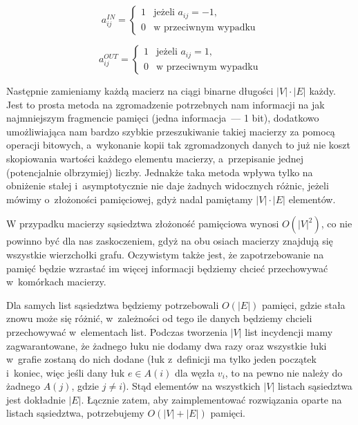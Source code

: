 \begin{equation}
	a^{IN}_{ij}= \left\{ 
	\begin{array}{ll}
	1 & \textrm{jeżeli $a_{ij} = -1$,}\\
	0 & \textrm{w przeciwnym wypadku}
	\end{array} \right.
\end{equation}

\begin{equation}
	a^{OUT}_{ij}= \left\{ 
	\begin{array}{ll}
	1 & \textrm{jeżeli $a_{ij} = 1$,}\\
	0 & \textrm{w przeciwnym wypadku}
	\end{array} \right.
\end{equation}

Następnie zamieniamy każdą macierz na ciągi binarne długości $ \left| V \right| \cdot \left| E \right| $ każdy. Jest to prosta metoda na zgromadzenie potrzebnych nam informacji na jak najmniejszym fragmencie pamięci (jedna informacja~---  1 bit), dodatkowo umożliwiająca nam bardzo szybkie przeszukiwanie takiej macierzy za pomocą operacji bitowych, a~wykonanie kopii tak zgromadzonych danych to już nie koszt skopiowania wartości każdego elementu macierzy, a~przepisanie jednej (potencjalnie olbrzymiej) liczby. Jednakże taka metoda wpływa tylko na obniżenie stałej i~asymptotycznie nie daje żadnych widocznych różnic, jeżeli mówimy o~złożoności pamięciowej, gdyż nadal pamiętamy $\left| V \right| \cdot \left| E \right|$ elementów.

W przypadku macierzy sąsiedztwa złożoność pamięciowa wynosi $O \left( \left| V \right| ^{2} \right) $, co nie powinno być dla nas zaskoczeniem, gdyż na obu osiach macierzy znajdują się wszystkie wierzchołki grafu. Oczywistym także jest, że zapotrzebowanie na pamięć będzie wzrastać im więcej informacji będziemy chcieć przechowywać w~komórkach macierzy.

Dla samych list sąsiedztwa będziemy potrzebowali $O \left( \left| E \right| \right) $ pamięci, gdzie stała znowu może się różnić, w~zależności od tego ile danych będziemy chcieli przechowywać w~elementach list. Podczas tworzenia $ \left| V \right| $ list incydencji mamy zagwarantowane, że żadnego łuku nie dodamy dwa razy oraz wszystkie łuki w~grafie zostaną do nich dodane (łuk z~definicji ma tylko jeden początek i~koniec, więc jeśli dany łuk $e \in A \left( i \right)$ dla węzła $v_{i}$, to na pewno nie należy do żadnego $A \left( j \right)$, gdzie $j \neq i$). Stąd elementów na wszystkich $ \left| V \right| $ listach sąsiedztwa jest dokładnie $ \left| E \right| $. Łącznie zatem, aby zaimplementować rozwiązania oparte na listach sąsiedztwa, potrzebujemy $ O \left( \left| V \right| + \left| E \right| \right)$ pamięci.

